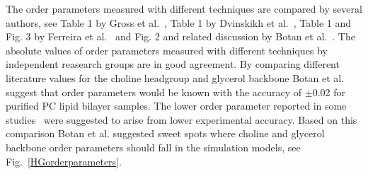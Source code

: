 \documentclass[aps,prl,superscriptaddress,twocolumn]{revtex4}
\begin{document}
The order parameters measured with different techniques are compared by several authors, see Table 1 by Gross et al.~\cite{gross97}, 
Table 1 by Dvinskikh et al.~\cite{dvinskikh05a}, Table 1 and Fig. 3 by Ferreira et al.~\cite{ferreira13} and Fig. 2 and related discussion
by Botan et al.~\cite{botan15}. The absolute values of order parameters measured with different techniques by independent reasearch groups are in good agreement. 
By comparing different literature values for the choline headgroup and glycerol backbone Botan et al. suggest that order parameters would be known with the accuracy of $\pm$0.02 for
purified PC lipid bilayer samples. The lower order parameter reported in some studies~\cite{??} were suggested to arise from lower experimental accuracy.
Based on this comparison Botan et al. suggested sweet spots where choline and glycerol backbone order parameters should fall in the simulation models, see Fig.~\ref{HGorderparameters}.
\end{document}
